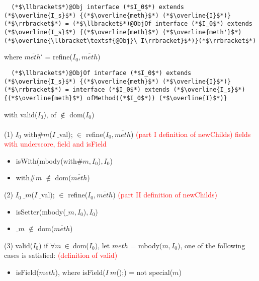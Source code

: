 \begin{figure*}
\begin{lstlisting}
  (*$\llbracket$*)@Obj interface (*$I_0$*) extends (*$\overline{I_s}$*) {(*$\overline{meth}$*) (*$\overline{I}$*)}(*$\rrbracket$*) = (*$\llbracket$*)@ObjOf interface (*$I_0$*) extends (*$\overline{I_s}$*) {(*$\overline{meth}$*) (*$\overline{meth'}$*) (*$\overline{\llbracket\textsf{@Obj}\ I\rrbracket}$*)}(*$\rrbracket$*)
\end{lstlisting}
\hspace{.3in}where $\overline{meth'}$ = \textsf{refine(}$I_0,\overline{meth}$\textsf{)}
\begin{lstlisting}
  (*$\llbracket$*)@ObjOf interface (*$I_0$*) extends (*$\overline{I_s}$*) {(*$\overline{meth}$*) (*$\overline{I}$*)}(*$\rrbracket$*) = interface (*$I_0$*) extends (*$\overline{I_s}$*) {(*$\overline{meth}$*) ofMethod((*$I_0$*)) (*$\overline{I}$*)}
\end{lstlisting}
\hspace{.3in}with \textsf{valid(}$I_0$\textsf{)}, \textsf{of} $\notin$ \textsf{dom(}$I_0$\textsf{)}
~\\~\\
(1) $I_0$ \textsf{with}$\#m$\textsf{(}$I\ \_$\textsf{val);} $\in$ \textsf{refine(}$I_0,\overline{meth}$\textsf{)} \textcolor{red}{(part I definition of newChilds) fields with underscore, field and isField}
    \begin{itemize}
    \item \textsf{isWith(mbody(with}$\#m,I_0$\textsf{)}$,I_0$\textsf{)}
    \item \textsf{with}$\#m$ $\notin$ \textsf{dom(}$\overline{meth}$\textsf{)}
    \end{itemize}
(2) $I_0\ \_m$\textsf{(}$I\ \_$\textsf{val);} $\in$ \textsf{refine(}$I_0,\overline{meth}$\textsf{)} \textcolor{red}{(part II definition of newChilds)}
    \begin{itemize}
    \item \textsf{isSetter(mbody(}$\_m,I_0$\textsf{)}$,I_0$\textsf{)}
    \item $\_m$ $\notin$ \textsf{dom(}$\overline{meth}$\textsf{)}
    \end{itemize}
(3) \textsf{valid(}$I_0$\textsf{)} if $\forall m\ \in\ $\textsf{dom(}$I_0$\textsf{)}, let $meth$ = \textsf{mbody(}$m,I_0$\textsf{)}, one of the following cases is satisfied:  \textcolor{red}{(definition of valid)}
    \begin{itemize}
    \item \textsf{isField(}$meth$\textsf{)}, where \textsf{isField(}$I\ m$\textsf{();)} = not \textsf{special(}$m$\textsf{)}

\end{itemize}
\end{figure*}
